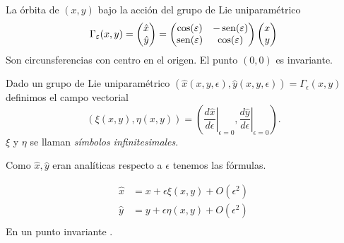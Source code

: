 \begin{ejemplo} La órbita de $(x,y)$ bajo la acción del grupo  de Lie uniparamétrico
\[
\Gamma_{\varepsilon}(x,y)= \begin{pmatrix} \hat{x}\\ \hat{y}
\end{pmatrix}=\begin{pmatrix} \cos(\varepsilon) & -\operatorname{sen}(\varepsilon)
\\ \operatorname{sen}(\varepsilon) & \cos(\varepsilon)
\end{pmatrix} \begin{pmatrix} x\\ y
\end{pmatrix}
\]
Son circunsferencias con centro en el origen. El punto $(0,0)$ es invariante.

\end{ejemplo}


\begin{definicion}
 Dado un grupo de Lie uniparamétrico $(\hat{x}(x,y,\epsilon),\hat{y}(x,y,\epsilon))=\Gamma_{\epsilon}(x,y)$  definimos el campo vectorial
\[(\xi(x,y),\eta(x, y))=\left(\left.\frac{d\hat{x}}{d\epsilon}\right|_{\epsilon=0}, \left.\frac{d\hat{y}}{d\epsilon}\right|_{\epsilon=0}   \right).\]
 $\xi$ y $\eta$ se llaman \emph{símbolos infinitesimales}.
 
 
Como $\hat{x},\hat{y}$ eran analíticas respecto a $\epsilon$ tenemos las fórmulas.

 
 \begin{equation}\label{eq:des_serie_infi}
\begin{array}{cc}
\hat{x}&=x+\epsilon\xi(x,y)+O(\epsilon^2)\\
\hat{y}&=y+\epsilon\eta(x,y)+O(\epsilon^2)\\
\end{array}
\end{equation}
 En un punto invariante .
 
\end{definicion}





